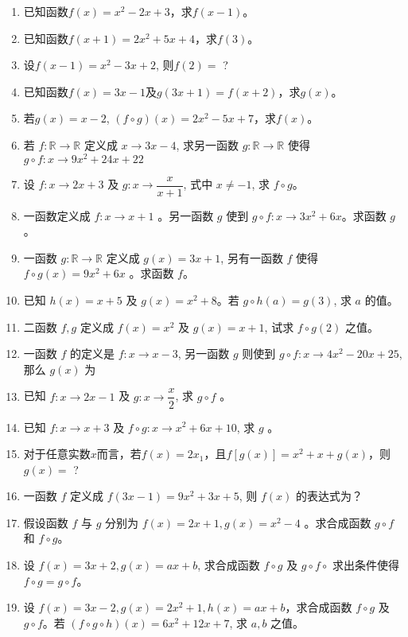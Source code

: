 \documentclass[UTF8]{ctexart}
\begin{document}
\begin{enumerate}
    \item 已知函数$f(x) = x^2 - 2x + 3$，求$f(x-1)$。
    \item 已知函数$f(x+1) = 2x^2 + 5x + 4$，求$f(3)$。
    \item 设$f(x-1) = x^2 - 3x + 2$, 则$f(2)=$ ?
    \item 已知函数$f(x) = 3x - 1$及$g(3x + 1) = f(x+2)$，求$g(x)$。
    \item 若$g(x) = x - 2$, $(f \circ g)(x) = 2x^2 - 5x + 7$，求$f(x)$。
    \item 若 $f: \mathbb{R} \rightarrow \mathbb{R}$ 定义成 $x \rightarrow 3 x-4$, 求另一函数 $g: \mathbb{R} \rightarrow \mathbb{R}$ 使得 $g \circ f: x \rightarrow 9 x^2+24 x+22$
    \item 设 $f: x \rightarrow 2 x+3$ 及 $g: x \rightarrow \dfrac{x}{x+1}$, 式中 $x \neq-1$, 求 $f \circ g$。
    \item 一函数定义成 $f: x \rightarrow x+1$ 。另一函数 $g$ 使到 $g \circ f: x \rightarrow 3 x^2+6 x$。求函数 $g$。
    \item 一函数 $g: \mathbb{R} \rightarrow \mathbb{R}$ 定义成 $g(x)=3 x+1$, 另有一函数 $f$ 使得 $f \circ g(x)=9 x^2+6 x$ 。求函数 $f$。
    \item 已知 $h(x)=x+5$ 及 $g(x)=x^2+8$。若 $g \circ h(a)=g(3)$, 求 $a$ 的值。
    \item 二函数 $f, g$ 定义成 $f(x)=x^2$ 及 $g(x)=x+1$, 试求 $f \circ g(2)$ 之值。
    \item 一函数 $f$ 的定义是 $f: x \rightarrow x-3$, 另一函数 $g$ 则使到 $g \circ f: x \rightarrow 4 x^2-20 x+25$, 那么 $g(x)$ 为
    \item 已知 $f: x \rightarrow 2 x-1$ 及 $g: x \rightarrow \dfrac{x}{2}$, 求 $g \circ f$ 。
    \item 已知 $f: x \rightarrow x+3$ 及 $f \circ g: x \rightarrow x^2+6 x+10$, 求 $g$ 。
    \item 对于任意实数$x$而言，若$f(x) = 2x _ 1$，且$f[g(x)] = x^2 + x + g(x)$，则$g(x) =$ ?
    \item 一函数 $f$ 定义成 $f(3 x-1)=9 x^2+3 x+5$, 则 $f(x)$ 的表达式为？
    \item 假设函数 $f$ 与 $g$ 分别为 $f(x)=2 x+1, g(x)=x^2-4$ 。求合成函数
    $g \circ f$ 和 $f \circ g$。
    \item 设 $f(x)=3 x+2, g(x)=a x+b$, 求合成函数 $f \circ g$ 及 $g \circ f \circ$ 求出条件使得 $f \circ g=g \circ f$。
    \item 设 $f(x)=3 x-2, g(x)=2 x^2+1, h(x)=a x+b$，求合成函数 $f \circ g$ 及 $g \circ f$。若 $(f \circ g \circ h)(x)=6 x^2+12 x+7$, 求 $a, b$ 之值。

\end{enumerate}
\end{document}
